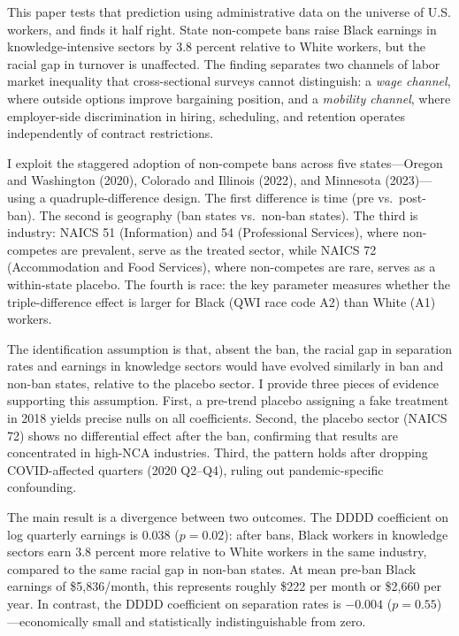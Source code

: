 \documentclass[12pt]{article}
\begin{document}
This paper tests that prediction using administrative data on the universe of U.S. workers, and finds it half right. State non-compete bans raise Black earnings in knowledge-intensive sectors by 3.8 percent relative to White workers, but the racial gap in turnover is unaffected. The finding separates two channels of labor market inequality that cross-sectional surveys cannot distinguish: a \emph{wage channel}, where outside options improve bargaining position, and a \emph{mobility channel}, where employer-side discrimination in hiring, scheduling, and retention operates independently of contract restrictions.

I exploit the staggered adoption of non-compete bans across five states---Oregon and Washington (2020), Colorado and Illinois (2022), and Minnesota (2023)---using a quadruple-difference design. The first difference is time (pre vs.\ post-ban). The second is geography (ban states vs.\ non-ban states). The third is industry: NAICS 51 (Information) and 54 (Professional Services), where non-competes are prevalent, serve as the treated sector, while NAICS 72 (Accommodation and Food Services), where non-competes are rare, serves as a within-state placebo. The fourth is race: the key parameter measures whether the triple-difference effect is larger for Black (QWI race code A2) than White (A1) workers.

The identification assumption is that, absent the ban, the racial gap in separation rates and earnings in knowledge sectors would have evolved similarly in ban and non-ban states, relative to the placebo sector. I provide three pieces of evidence supporting this assumption. First, a pre-trend placebo assigning a fake treatment in 2018 yields precise nulls on all coefficients. Second, the placebo sector (NAICS 72) shows no differential effect after the ban, confirming that results are concentrated in high-NCA industries. Third, the pattern holds after dropping COVID-affected quarters (2020 Q2--Q4), ruling out pandemic-specific confounding.

The main result is a divergence between two outcomes. The DDDD coefficient on log quarterly earnings is 0.038 ($p = 0.02$): after bans, Black workers in knowledge sectors earn 3.8 percent more relative to White workers in the same industry, compared to the same racial gap in non-ban states. At mean pre-ban Black earnings of \$5,836/month, this represents roughly \$222 per month or \$2,660 per year. In contrast, the DDDD coefficient on separation rates is $-0.004$ ($p = 0.55$)---economically small and statistically indistinguishable from zero.
\end{document}
